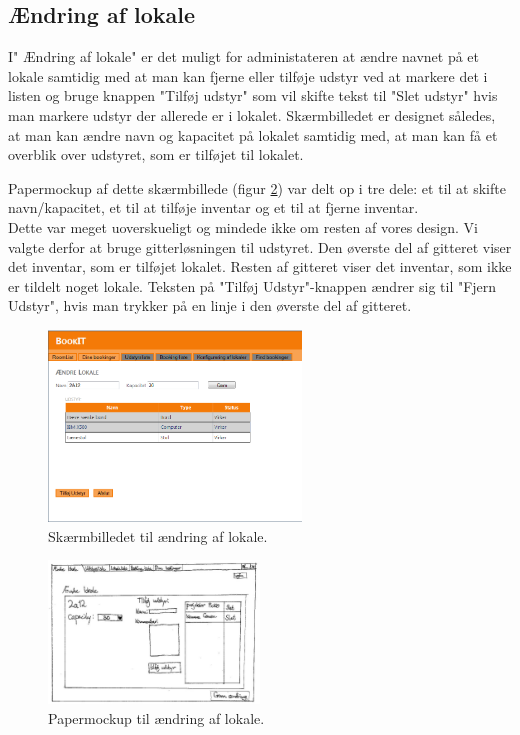 \subsection{Ændring af lokale}
I" Ændring af lokale" er det muligt for administateren at ændre navnet på et lokale samtidig med at man kan fjerne eller tilføje udstyr ved at markere det i listen og bruge knappen "Tilføj udstyr" som vil skifte tekst til "Slet udstyr" hvis man markere udstyr der allerede er i lokalet.
Skærmbilledet er designet således, at man kan ændre navn og kapacitet på lokalet samtidig med, at man kan få et overblik over udstyret, som er tilføjet til lokalet.

Papermockup af dette skærmbillede (figur \ref{Design_G_Development_AendreLokale}) var delt op i tre dele: et til at skifte navn/kapacitet, et til at tilføje inventar og et til at fjerne inventar.
\\Dette var meget uoverskueligt og mindede ikke om resten af vores design. Vi valgte derfor at bruge gitterløsningen til udstyret. Den øverste del af gitteret viser det inventar, som er tilføjet lokalet. Resten af gitteret viser det inventar, som ikke er tildelt noget lokale. Teksten på "Tilføj Udstyr"-knappen ændrer sig til "Fjern Udstyr", hvis man trykker på en linje i den øverste del af gitteret.

\begin{figure}[h!]
  \centering
    \includegraphics[width=0.6\textwidth]{Appendix/GUI-Prototype/DigitalMockup/AendreLokale}
  \caption{Skærmbilledet til ændring af lokale.}
\label{Design_G_Development_AendreLokale_Final}
\end{figure} 

\begin{figure}[h!]
  \centering
    \includegraphics[angle=90, width=0.5\textwidth]{Appendix/GUI-Prototype/PaperMockup/AendreLokale_001}
  \caption{Papermockup til ændring af lokale.}
\label{Design_G_Development_AendreLokale}
\end{figure} 

